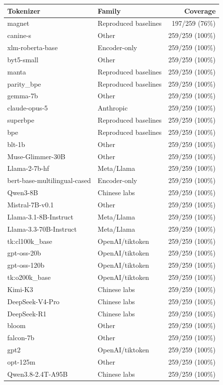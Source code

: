 \begin{tabular}{llr}
\toprule
Tokenizer & Family & Coverage \\
\midrule
magnet & Reproduced baselines & 197/259 (76\%) \\
canine-s & Other & 259/259 (100\%) \\
xlm-roberta-base & Encoder-only & 259/259 (100\%) \\
byt5-small & Other & 259/259 (100\%) \\
manta & Reproduced baselines & 259/259 (100\%) \\
parity\_bpe & Reproduced baselines & 259/259 (100\%) \\
gemma-7b & Other & 259/259 (100\%) \\
claude-opus-5 & Anthropic & 259/259 (100\%) \\
superbpe & Reproduced baselines & 259/259 (100\%) \\
bpe & Reproduced baselines & 259/259 (100\%) \\
blt-1b & Other & 259/259 (100\%) \\
Muse-Glimmer-30B & Other & 259/259 (100\%) \\
Llama-2-7b-hf & Meta/Llama & 259/259 (100\%) \\
bert-base-multilingual-cased & Encoder-only & 259/259 (100\%) \\
Qwen3-8B & Chinese labs & 259/259 (100\%) \\
Mistral-7B-v0.1 & Other & 259/259 (100\%) \\
Llama-3.1-8B-Instruct & Meta/Llama & 259/259 (100\%) \\
Llama-3.3-70B-Instruct & Meta/Llama & 259/259 (100\%) \\
tk:cl100k\_base & OpenAI/tiktoken & 259/259 (100\%) \\
gpt-oss-20b & OpenAI/tiktoken & 259/259 (100\%) \\
gpt-oss-120b & OpenAI/tiktoken & 259/259 (100\%) \\
tk:o200k\_base & OpenAI/tiktoken & 259/259 (100\%) \\
Kimi-K3 & Chinese labs & 259/259 (100\%) \\
DeepSeek-V4-Pro & Chinese labs & 259/259 (100\%) \\
DeepSeek-R1 & Chinese labs & 259/259 (100\%) \\
bloom & Other & 259/259 (100\%) \\
falcon-7b & Other & 259/259 (100\%) \\
gpt2 & OpenAI/tiktoken & 259/259 (100\%) \\
opt-125m & Other & 259/259 (100\%) \\
Qwen3.8-2.4T-A95B & Chinese labs & 259/259 (100\%) \\
\bottomrule
\end{tabular}